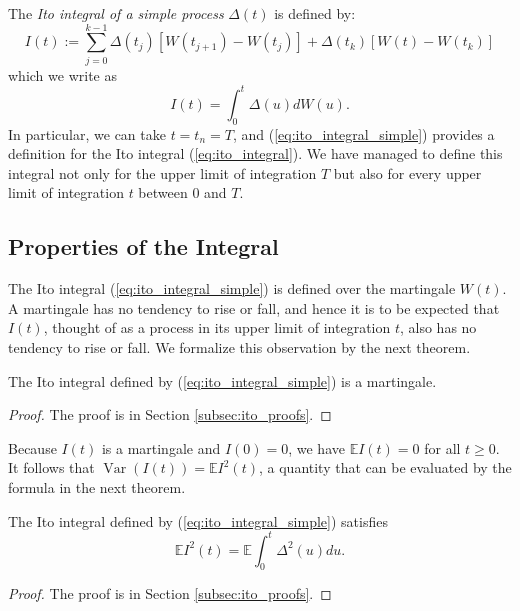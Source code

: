 \documentclass[\topdir/lecture\_notes.tex]{subfiles}
\begin{document}
The \emph{Ito integral of a simple process} $\Delta(t)$ is defined by:
\begin{equation}
I(t):=\sum_{j=0}^{k-1} \Delta(t_{j})[W(t_{j+1})-W(t_{j})]+\Delta(t_{k})[W(t)-W(t_{k})] \label{eq:ito_integral_simple}
\end{equation}
which we write as
\begin{equation*}
I(t)=\int_{0}^{t} \Delta(u) dW(u).
\end{equation*}
In particular, we can take $t=t_{n}=T$, and (\ref{eq:ito_integral_simple}) provides a definition for the Ito integral (\ref{eq:ito_integral}). We have managed to define this integral not only for the upper limit of integration $T$ but also for every upper limit of integration $t$ between 0 and $T$.

\subsection{Properties of the Integral}\label{subsec:integral_properties}
The Ito integral (\ref{eq:ito_integral_simple}) is defined over the martingale $W(t)$. A martingale has no tendency to rise or fall, and hence it is to be expected that $I(t)$, thought of as a process in its upper limit of integration $t$, also has no tendency to rise or fall. We formalize this observation by the next theorem.
\begin{theorem}\label{thm:ito_integral_martingale}
The Ito integral defined by (\ref{eq:ito_integral_simple}) is a martingale.
\end{theorem}
\begin{proof} The proof is in Section \ref{subsec:ito_proofs}.\end{proof}

Because $I(t)$ is a martingale and $I(0)=0$, we have $\mathbb{E} I(t)=0$ for all $t \geq 0$. It follows that $\operatorname{Var}(I(t))=\mathbb{E} I^{2}(t)$, a quantity that can be evaluated by the formula in the next theorem.
\begin{theorem} \label{thm:ito_isometry}
The Ito integral defined by (\ref{eq:ito_integral_simple}) satisfies
\begin{equation*}
\mathbb{E} I^{2}(t)=\mathbb{E} \int_{0}^{t} \Delta^{2}(u) du.
\end{equation*}
\end{theorem}
\begin{proof} The proof is in Section \ref{subsec:ito_proofs}.\end{proof}
\end{document}
